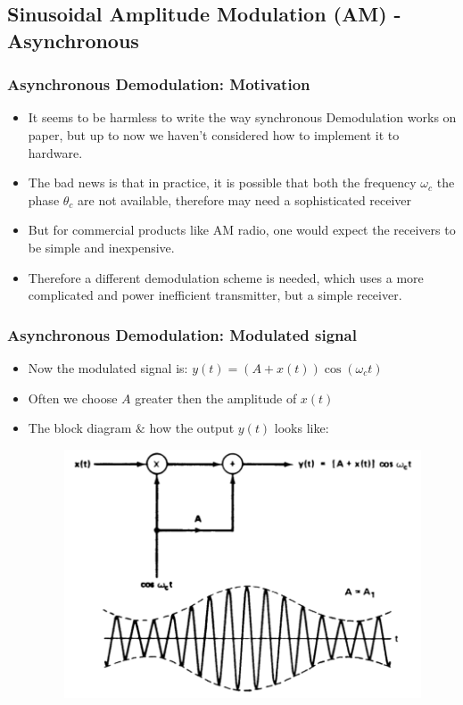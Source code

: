 \documentclass{beamer}
\begin{document}
\subsection{Sinusoidal Amplitude Modulation (AM) - Asynchronous}
\begin{frame}
\frametitle{Asynchronous Demodulation: Motivation}
\begin{itemize}
\item It seems to be harmless to write the way synchronous Demodulation works on paper, but up to now we haven't considered how to implement it to hardware.
\item The bad news is that in practice, it is possible that both the frequency $\omega_c$ the phase $\theta_c$ are not available, therefore may need a sophisticated receiver
\item But for commercial products like AM radio, one would expect the receivers to be simple and inexpensive. 
\item Therefore a different demodulation scheme is needed, which uses a more complicated and power inefficient transmitter, but a simple receiver.
\end{itemize}
\end{frame}

\begin{frame}
\frametitle{Asynchronous Demodulation: Modulated signal}
\begin{itemize}
\item Now the modulated signal is: $y(t) = (A + x(t))\cos(\omega_ct)$
\item Often we choose $A$ greater then the amplitude of $x(t)$
\item The block diagram $\&$ how the output $y(t)$ looks like:
\begin{figure}
\includegraphics[width=0.6\linewidth]{asyn2}
\end{figure}
\end{itemize}
\end{frame}
\end{document}

